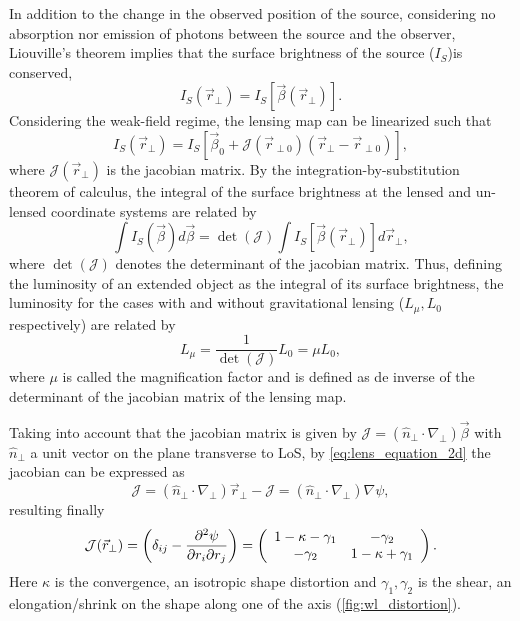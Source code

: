 In addition to the change in the observed position of the source, considering no absorption nor emission of photons between the source and the observer, Liouville's theorem implies that the surface brightness of the source ($I_S$)is conserved,
\begin{equation}
I_S(\vec r_\perp) = I_S[\vec\beta(\vec r_\perp)].
\end{equation}
Considering the weak-field regime, the lensing map can be linearized such that
\begin{equation}
I_S(\vec r_\perp)=I_S[\vec\beta_0+\mathcal{J}(\vec r_{\perp 0})(\vec r_\perp-\vec r_{\perp0})],
\end{equation}
where $\mathcal{J}(\vec r_\perp)$ is the jacobian matrix. By the integration-by-substitution theorem of calculus, the integral of the surface brightness at the lensed and un-lensed coordinate systems are related by
\begin{equation}
\int I_S(\vec\beta)d\vec\beta = \det(\mathcal{J})\int I_S[\vec\beta(\vec r_\perp)]d\vec r_\perp,
\end{equation}
where $\det(\mathcal{J})$ denotes the determinant of the jacobian matrix. Thus, defining the luminosity of an extended object as the integral of its surface brightness, the luminosity for the cases with and without gravitational lensing ($L_\mu,L_0$ respectively) are related by
\begin{equation}
L_\mu = \frac{1}{\det(\mathcal{J})}L_0 = \mu L_0,
\end{equation}
where $\mu$ is called the magnification factor and is defined as de inverse of the determinant of the jacobian matrix of the lensing map.
\newline

Taking into account that the jacobian matrix is given by $\mathcal{J}=(\hat n_\perp\cdot\nabla_\perp)\vec\beta$ with $\hat n_\perp$ a unit vector on the plane transverse to LoS, by \autoref{eq:lens_equation_2d} the jacobian can be expressed as
\begin{equation}
\mathcal{J} = (\hat n_\perp\cdot\nabla_\perp)\vec r_\perp-\mathcal{J} = (\hat n_\perp\cdot\nabla_\perp)\nabla\psi,
\end{equation}
resulting finally 
\begin{equation}
\mathcal{J}(\vec r_\perp) = \left(\delta_{ij}-\frac{\partial^2\psi}{\partial r_i\partial r_j}\right)=\left( \begin{array}{c c}1-\kappa-\gamma_1 & -\gamma_2\\-\gamma_2 & 1-\kappa+\gamma_1\end{array} \right).
\label{eq:jacobian}
\end{equation}
Here $\kappa$ is the convergence, an isotropic shape distortion and $\gamma_1,\gamma_2$ is the shear, an elongation/shrink on the shape along one of the axis (\autoref{fig:wl_distortion}).
\newline

